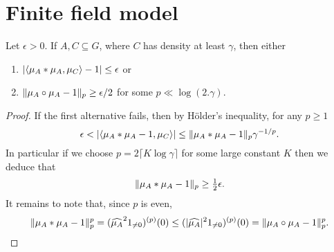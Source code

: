 \chapter{Finite field model}

\begin{lemma}\label{global_dichotomy}
Let $\epsilon >0$. If $A,C\subseteq G$, where $C$ has density at least $\gamma$, then either
\begin{enumerate}
\item  $\left\lvert \langle \mu_A\ast \mu_A,\mu_C\rangle -1\right\rvert\leq \epsilon$ or
\item $\lVert \mu_A\circ \mu_A-1\rVert_p \geq \epsilon/2$ for some $p\ll\log(2.\gamma)$.
\end{enumerate}
\end{lemma}
\begin{proof}
If the first alternative fails, then by H\"{o}lder's inequality, for any $p\geq 1$
\[\epsilon < \left\lvert  \langle \mu_A \ast \mu_A - 1, \mu_C \rangle \right\rvert \leq \lVert \mu_A\ast \mu_A-1\rVert_p\gamma^{-1/p}.\]
In particular if we choose $p=2\lceil K\log{\gamma}\rceil$ for some large constant $K$ then we deduce that
\[\lVert \mu_A\ast \mu_A-1\rVert_{p}\geq \tfrac{1}{2}\epsilon.\]
It remains to note that, since $p$ is even,
\[\lVert \mu_A\ast \mu_A-1\rVert_{p}^p=(\widehat{\mu_A}^21_{\neq 0})^{(p)}(0)\leq(\lvert \widehat{\mu_A} \rvert^21_{\neq 0})^{(p)}(0)=\lVert \mu_A\circ \mu_A-1\rVert_p^p. \qedhere \]
\end{proof}


